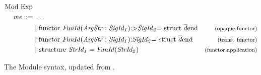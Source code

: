 \begin{figure}[H]
\begin{align*}
\begin{aligned}
%
\text{Mod Exp }\\
\mathit{me} ::= \; & \ldots\\
&|\; \text{\lsttext{functor $\ \cmath{FunId}$($\cmath{ArgStr:SigId_{1}}$):>$\cmath{SigId_{2}}$ = struct $\ \overline{d}$ end}} & \expl{(opaque functor)}\\
&|\; \text{\lsttext{functor $\ \cmath{FunId}$($\cmath{ArgStr:SigId_{1}}$):$\cmath{SigId_{2}}$ = struct $\ \overline{d}$ end}} & \expl{(trans. functor)}\\
&|\; \text{\lsttext{structure}}\ \mathit{StrId_{1} = FunId(StrId_{2})}&\expl{(functor application)}\\
\end{aligned}
\end{align*}
\caption[Updated Module Syntax]{The Module syntax, updated from {\protect{}}.\label{fig:UpdatedModuleSyntax}}
\end{figure}